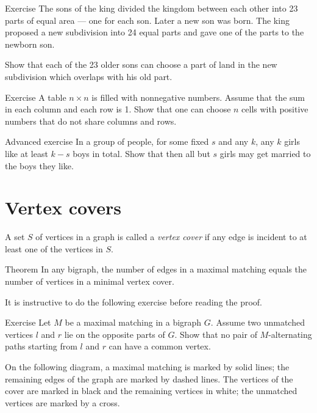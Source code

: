 \begin{thm}{Exercise}\label{ex:sons(king)}
The sons of the king divided the kingdom between each other into 23 parts of equal area --- one for each son.
Later a new son was born. 
The king proposed a new subdivision into 24 equal parts and gave one of the parts to the newborn son.

Show that each of the 23 older sons can choose a part of land in the new subdivision which overlaps with his old part.
\end{thm}

\begin{thm}{Exercise}\label{ex:nxn-table}
A table $n{\times}n$ is filled with nonnegative numbers.
Assume that the sum in each column and each row is 1.
Show that one can choose $n$ cells with positive numbers that do not share columns and rows. 
\end{thm}

\begin{thm}{Advanced exercise}\label{ex:camel17}
In a group of people, for some fixed $s$ and any $k$,
any $k$ girls like at least $k-s$ boys in total.
Show that then all but $s$ girls may get married to the boys they like.
\end{thm}



\section{Vertex covers}

A set $S$ of vertices in a graph is called a \emph{vertex cover} if any edge is incident to at least one of the vertices in $S$.

\begin{thm}{Theorem}\label{thm:vertex-cover}
In any bigraph, the number of edges in a maximal matching equals the number of vertices in a minimal vertex cover.
\end{thm}

It is instructive to do the following exercise before reading the proof.

\begin{thm}{Exercise}\label{ex:two-paths}
Let $M$ be a maximal matching in a bigraph $G$.
Assume two unmatched vertices $l$ and $r$ lie on the opposite parts of $G$.
Show that no pair of $M$-alternating paths starting from $l$ and $r$ can have a common vertex.
\end{thm}

On the following diagram, a maximal matching is marked by solid lines;
the remaining edges of the graph are marked by dashed lines.
The vertices of the cover are marked in black and the remaining vertices in white;
the unmatched vertices are marked by a cross.

